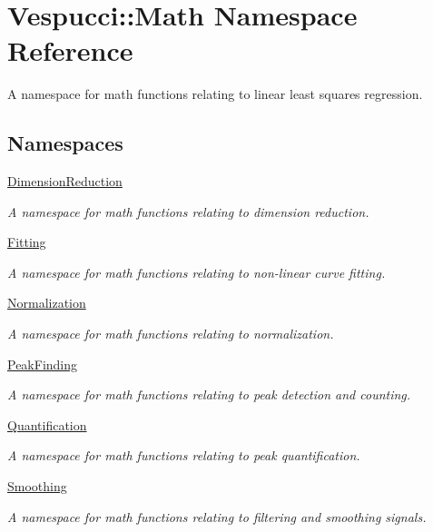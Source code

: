 \hypertarget{namespace_vespucci_1_1_math}{\section{Vespucci\+:\+:Math Namespace Reference}
\label{namespace_vespucci_1_1_math}
}


A namespace for math functions relating to linear least squares regression.  


\subsection*{Namespaces}
\begin{DoxyCompactItemize}
\item 
 \hyperlink{namespace_vespucci_1_1_math_1_1_dimension_reduction}{Dimension\+Reduction}
\begin{DoxyCompactList}\small\item\em A namespace for math functions relating to dimension reduction. \end{DoxyCompactList}\item 
 \hyperlink{namespace_vespucci_1_1_math_1_1_fitting}{Fitting}
\begin{DoxyCompactList}\small\item\em A namespace for math functions relating to non-\/linear curve fitting. \end{DoxyCompactList}\item 
 \hyperlink{namespace_vespucci_1_1_math_1_1_normalization}{Normalization}
\begin{DoxyCompactList}\small\item\em A namespace for math functions relating to normalization. \end{DoxyCompactList}\item 
 \hyperlink{namespace_vespucci_1_1_math_1_1_peak_finding}{Peak\+Finding}
\begin{DoxyCompactList}\small\item\em A namespace for math functions relating to peak detection and counting. \end{DoxyCompactList}\item 
 \hyperlink{namespace_vespucci_1_1_math_1_1_quantification}{Quantification}
\begin{DoxyCompactList}\small\item\em A namespace for math functions relating to peak quantification. \end{DoxyCompactList}\item 
 \hyperlink{namespace_vespucci_1_1_math_1_1_smoothing}{Smoothing}
\begin{DoxyCompactList}\small\item\em A namespace for math functions relating to filtering and smoothing signals. \end{DoxyCompactList}\end{DoxyCompactItemize}
